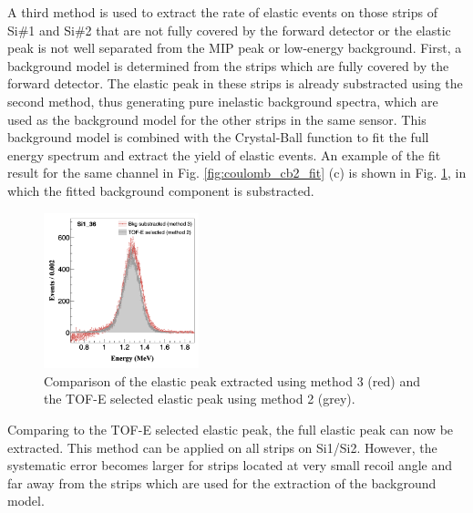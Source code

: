 \documentclass[fleqn,twocolumn,a4paper]{ikpar}
\begin{document}
\par
\medskip

A third method is used to extract the rate of elastic events on those strips of
Si\#1 and Si\#2 that are not fully covered by the forward detector or the
elastic peak is not well separated from the MIP peak or low-energy background.
First, a background model is determined from the strips which are fully covered by the forward detector.
The elastic peak in these strips is already substracted using the second method, thus generating 
pure inelastic background spectra, which are used as the background model
for the other strips in the same sensor.
This background model is combined with the Crystal-Ball function to fit the full
energy spectrum and extract the yield of elastic events.
An example of the fit result for the same channel in Fig. \ref{fig:coulomb_cb2_fit}
(c) is shown in Fig. \ref{fig:bkg_vs_tofe}, in which the fitted background component is substracted. 
\begin{figure}[b!]
  \centering
	\includegraphics[width=0.4\textwidth]{./bkg_vs_tofe.png}
  \caption{Comparison of the elastic peak extracted using method 3 (red) and
    the TOF-E selected elastic peak using method 2 (grey).}
  \label{fig:bkg_vs_tofe}
\end{figure}
Comparing to the TOF-E selected elastic peak, the full elastic peak can now be extracted.
This method can be applied on all strips on Si1/Si2.
However, the systematic error becomes larger for strips located at very small
recoil angle and far away from the strips which are used for the extraction of the background model.

\par
\medskip
\end{document}
